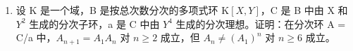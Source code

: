 \begin{enumerate}
\begin{enumerate}
\def\labelenumii{(\alph{enumii})}
\item
  证明：若 \(f \in \mathbf{A}_d\) 且 \(d > 0\)，则环 \(\mathrm{A}_{(f^{\sharp})}^{\sharp}\) 同构于 \((\mathbf{A}_f)^{\geqslant}\)（记号见习题 1）。
\item
  \(\mathbf{A}^{\natural}\) 是有限生成 A-代数的充要条件是 \(\mathbf{A}\) 是有限生成 \(\mathbf{A}_0\)-代数。
\item
  要使 \(\mathbf{A}_{n+1}^{\natural} = \mathbf{A}_1^{\natural}\mathbf{A}_n^{\natural}\)（分别使 \(\mathbf{A}_n^{\natural} = (\mathbf{A}_1^{\natural})^n\)）在 \(n \geqslant n_0\) 时成立，其充要条件是 \(\mathbf{A}_{n+1} = \mathbf{A}_1\mathbf{A}_n\)（分别 \(\mathbf{A}_n = (\mathbf{A}_1)^n\)）在 \(n \geqslant n_0\) 时成立。
\end{enumerate}

\item
  设 K 是一个域，B 是按总次数分次的多项式环 \(\mathrm{K}[X,Y]\)，C 是 B 中由 X 和 \(Y^{2}\) 生成的分次子环，a 是 C 中由 \(Y^{4}\) 生成的分次理想。证明：在分次环 A = C/a 中，\(A_{n+1} = A_{1}A_{n}\) 对 \(n \geqslant 2\) 成立，但 \(A_{n} \neq (A_{1})^{n}\) 对 \(n \geqslant 6\) 成立。
\end{enumerate}
\relax{}
